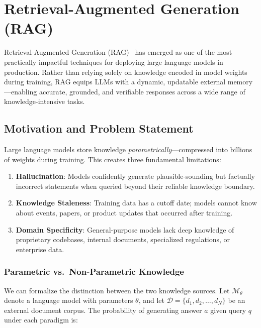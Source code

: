 \chapter{Retrieval-Augmented Generation (RAG)}
\label{retrieval-augmented-generation-rag}

Retrieval-Augmented Generation (RAG)~\cite{lewis2020retrieval} has emerged as one of the most practically impactful techniques for deploying large language models in production. Rather than relying solely on knowledge encoded in model weights during training, RAG equips LLMs with a dynamic, updatable external memory---enabling accurate, grounded, and verifiable responses across a wide range of knowledge-intensive tasks.

\section{Motivation and Problem Statement}
\label{motivation-and-problem-statement}

\begin{keybox}
Large language models store knowledge \emph{parametrically}---compressed into billions of weights during training. This creates three fundamental limitations:

\begin{enumerate}
  \item \textbf{Hallucination}: Models confidently generate plausible-sounding but factually incorrect statements when queried beyond their reliable knowledge boundary.
  \item \textbf{Knowledge Staleness}: Training data has a cutoff date; models cannot know about events, papers, or product updates that occurred after training.
  \item \textbf{Domain Specificity}: General-purpose models lack deep knowledge of proprietary codebases, internal documents, specialized regulations, or enterprise data.
\end{enumerate}
\end{keybox}

\subsection{Parametric vs.~Non-Parametric Knowledge}
\label{parametric-vs.-non-parametric-knowledge}

We can formalize the distinction between the two knowledge sources. Let $\mathcal{M}_\theta$ denote a language model with parameters $\theta$, and let $\mathcal{D} = \{d_1, d_2, \ldots, d_N\}$ be an external document corpus. The probability of generating answer $a$ given query $q$ under each paradigm is:

